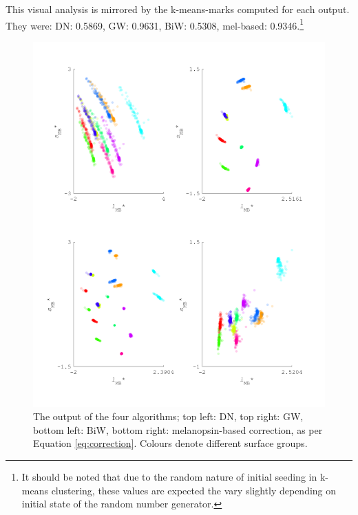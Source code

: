 This visual analysis is mirrored by the k-means-marks computed for each output. They were: \gls{DN}: 0.5869, \gls{GW}: 0.9631, \gls{BiW}: 0.5308, mel-based: 0.9346.\footnote{It should be noted that due to the random nature of initial seeding in k-means clustering, these values are expected the vary slightly depending on initial state of the random number generator.}

\begin{figure}[htbp]
\includegraphics[max width=1.2\textwidth, center]{figs/comp/comparisonFourAlgos/output100.pdf}
 \caption{The output of the four algorithms; top left: \gls{DN}, top right: \gls{GW}, bottom left: \gls{BiW}, bottom right: melanopsin-based correction, as per Equation \ref{eq:correction}. Colours denote different surface groups.}
 \label{fig:output100}
\end{figure} 

